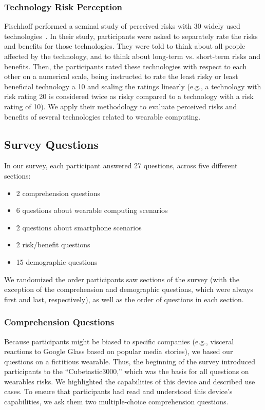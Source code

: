 \subsubsection{Technology Risk Perception}
Fischhoff \etal performed a seminal study of perceived risks with 30 widely used technologies~\cite{Fischhoff}. In their study, participants were asked to separately rate the risks and benefits for those technologies. They were told to think about all people affected by the technology, and to think about long-term vs. short-term risks and benefits. Then, the participants rated these technologies with respect to each other on a numerical scale, being instructed to rate the least risky or least beneficial technology a 10 and scaling the ratings linearly (e.g., a technology with risk rating 20 is considered twice as risky compared to a technology with a risk rating of 10).
We apply their methodology to evaluate perceived risks and benefits of several technologies related to wearable computing.

\subsection{Survey Questions}
In our survey, each participant answered 27 questions, across five different sections:   \\[-.8cm]

\begin{itemize} \itemsep1pt \parskip0pt 
\item 2 comprehension questions
\item 6 questions about wearable computing scenarios 
\item 2 questions about smartphone scenarios 
\item 2 risk/benefit questions 
\item 15 demographic questions \\[-.8cm]
\end{itemize}

We randomized the order participants saw sections of the survey (with the exception of the comprehension and demographic questions, which were always first and last, respectively), as well as the order of questions in each section.

\subsubsection{Comprehension Questions}
Because participants might be biased to specific companies (e.g., visceral reactions to Google Glass based on popular media stories), we based our questions on a fictitious wearable. Thus, the beginning of the survey introduced participants to the ``Cubetastic3000,'' which was the basis for all questions on wearables risks. We highlighted the capabilities of this device and described use cases. To ensure that participants had read and understood this device's capabilities, we ask them two multiple-choice comprehension questions.

